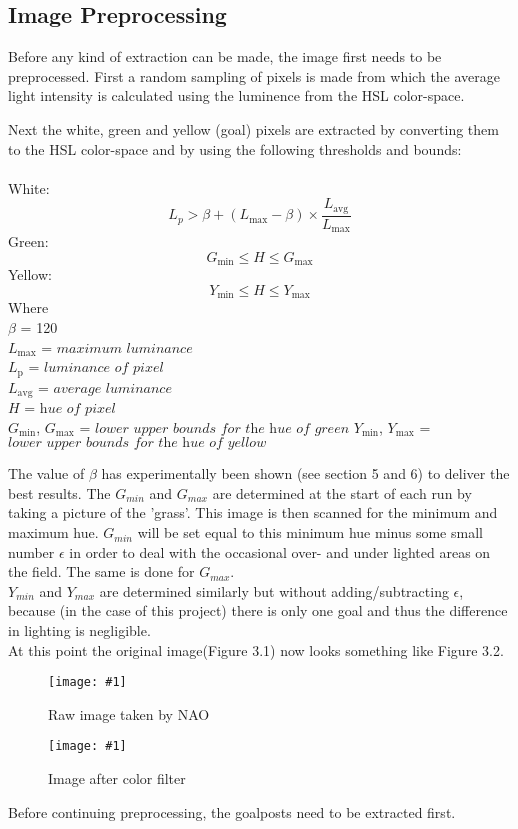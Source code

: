\documentclass{ba-kecs}
\numberwithin{figure}{section}
\numberwithin{equation}{section}
\newcommand{\dkepic}[2]{ %
	\begin{figure}[H] %
	\texttt{[image: \#1]}
	\caption{#2}
	\label{#1}
	\end{figure}
}
\begin{document}
\subsection{Image Preprocessing}
Before any kind of extraction can be made, the image first needs to be preprocessed. First a random sampling of pixels is made from which the average light intensity is calculated using the luminence from the HSL color-space.

Next the white, green and yellow (goal) pixels are extracted by converting them to the HSL color-space and by using the following thresholds and bounds:\\ \\
White:
	\begin{equation}
	L_{p} > \beta + (L_{\mathrm{max}}-\beta) \times \frac{L_{\mathrm{avg}}}{L_{\mathrm{max}}} \label{whiteImgProc}
	\end{equation}
Green:
	\begin{equation}
	G_{\mathrm{min}} \leq H \leq G_{\mathrm{max}} \label{greenImgProc}
	\end{equation}
Yellow:
	\begin{equation}
	Y_{\mathrm{min}} \leq H \leq Y_{\mathrm{max}} \label{yellowImgProc}
	\end{equation}
Where \\
	$\beta$ = 120 \\
	$L_{\mathrm{max}}$ = $\textit{maximum luminance}$ \\
	$L_{\mathrm{p}}$ = $\textit{luminance of pixel}$ \\
	$L_{\mathrm{avg}}$ = $\textit{average luminance}$ \\
	$\textit{H}$ = $\textit{hue of pixel}$ \\
	$G_{\mathrm{min}}$, $G_{\mathrm{max}}$ = $\textit{lower upper bounds for 		the hue of green}$
	$Y_{\mathrm{min}}$, $Y_{\mathrm{max}}$ = $\textit{lower upper bounds for 		the hue of yellow}$
	
The value of $\beta$ has experimentally been shown (see section 5 and 6) to deliver the best results. The $G_{min}$ and $G_{max}$ are determined at the start of each run by taking a picture of the 'grass'. This image is then scanned for the minimum and maximum hue. $G_{min}$ will be set equal to this minimum hue minus some small number $\epsilon$ in order to deal with the occasional over- and under lighted areas on the field. The same is done for $G_{max}$.\\
$Y_{min}$ and $Y_{max}$ are determined similarly but without adding/subtracting $\epsilon$, because (in the case of this project) there is only one goal and thus the difference in lighting is negligible.\\
At this point the original image(Figure 3.1) now looks something like Figure 3.2.\\
\dkepic{figure_IP1}{Raw image taken by NAO}
\dkepic{figure_IP2}{Image after color filter}
Before continuing preprocessing, the goalposts need to be extracted first.
\end{document}
